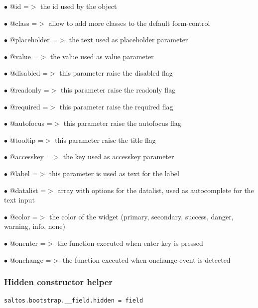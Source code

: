 \documentclass[a4paper]{article}
\begin{document}
\begin{compactitem}
\item[\color{myblue}$\bullet$] @id          =$>$ the id used by the object
\item[\color{myblue}$\bullet$] @class       =$>$ allow to add more classes to the default form-control
\item[\color{myblue}$\bullet$] @placeholder =$>$ the text used as placeholder parameter
\item[\color{myblue}$\bullet$] @value       =$>$ the value used as value parameter
\item[\color{myblue}$\bullet$] @disabled    =$>$ this parameter raise the disabled flag
\item[\color{myblue}$\bullet$] @readonly    =$>$ this parameter raise the readonly flag
\item[\color{myblue}$\bullet$] @required    =$>$ this parameter raise the required flag
\item[\color{myblue}$\bullet$] @autofocus   =$>$ this parameter raise the autofocus flag
\item[\color{myblue}$\bullet$] @tooltip     =$>$ this parameter raise the title flag
\item[\color{myblue}$\bullet$] @accesskey   =$>$ the key used as accesskey parameter
\item[\color{myblue}$\bullet$] @label       =$>$ this parameter is used as text for the label
\item[\color{myblue}$\bullet$] @datalist    =$>$ array with options for the datalist, used as autocomplete for the text input
\item[\color{myblue}$\bullet$] @color       =$>$ the color of the widget (primary, secondary, success, danger, warning, info, none)
\item[\color{myblue}$\bullet$] @onenter     =$>$ the function executed when enter key is pressed
\item[\color{myblue}$\bullet$] @onchange    =$>$ the function executed when onchange event is detected
\end{compactitem}

\hypertarget{toc51}{}
\subsubsection{Hidden constructor helper}

\begin{lstlisting}
saltos.bootstrap.__field.hidden = field
\end{lstlisting}
\end{document}
